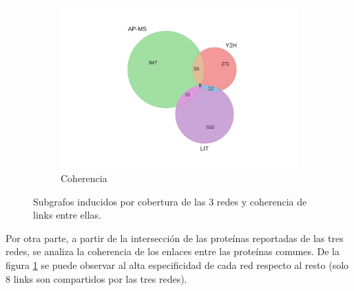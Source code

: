 \begin{figure}[!ht]
\begin{subfigure}[b]{0.48\columnwidth}
        \includegraphics[width=\textwidth]{./schemes/venn_AP-MS-Y2H-LIT_links.pdf}
        \caption{\label{fig:cohe} Coherencia}
    \end{subfigure}
    \caption{\label{fig:venn} Subgrafos inducidos por cobertura de las 3 redes y coherencia de links entre ellas. }
\end{figure}

\vspace{1.5cm}
Por otra parte, a partir de la intersecci\'on de las prote\'inas reportadas de las tres redes, se analiza la coherencia
de los enlaces entre las prote\'inas comunes. De la figura \ref{fig:cohe} se puede observar al alta especificidad
de cada red respecto al resto (solo 8 links son compartidos por las tres redes). 


